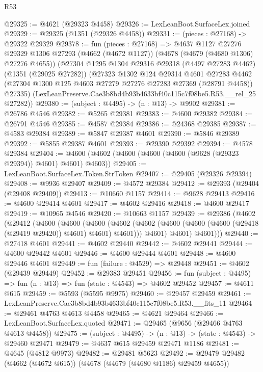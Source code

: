 \begin{lexlean}{R53}
\begin{coremodule}
@29325 := @4621 (@29323 @4458)
@29326 := LexLeanBoot.SurfaceLex.joined
@29329 := @29325 (@1351 (@29326 @4458))
@29331 := (pieces : @27168) -> @29322 @29329
@29378 := fun (pieces : @27168) =>
  @4637
    @1127
    @27276
    @29329
    @1306
    @27293
    (@4662 (@4672 @1127))
    (@4678 (@4679 (@4680 @1306) @27276 @4655))
    (@27304
      @1295
      @1304
      @29316
      @29318
      (@4497 @27283 @4462)
      (@1351 (@29025 @27282))
      (@27323
        @1302
        @124
        @29314
        @4601
        @27283
        @4462
        (@27304 @1300 @125 @4603 @27279 @27276 @27283 @27369 (@28791 @4458))
        @27335)
      (LexLeanPreserve.Cae3b8bd4b93b4633bf40c115c7f08be5.R53.__rel_25 @27282))
@29380 := (subject : @4495) -> (n : @13) -> @9902
@29381 := @26786 @4546
@29382 := @5265 @29381
@29383 := @4600 @29382
@29384 := @26791 @4546
@29385 := @4587 @29384
@29386 := @24368 @29385
@29387 := @4583 @29384
@29389 := @5847 @29387 @4601
@29390 := @5846 @29389
@29392 := @5855 @29387 @4601
@29393 := @29390 @29392
@29394 := @4578 @29384
@29404 := @4600 (@4602 (@4600 (@4600 (@4600 (@9628 (@29323 @29394)) @4601) @4601) @4603))
@29405 := LexLeanBoot.SurfaceLex.Token.StrToken
@29407 := @29405 (@29326 @29394)
@29408 := @9936 @29407
@29409 := @4572 @29384
@29412 := @29393 (@29404 (@29408 @29409))
@29413 := @10660 @1157
@29414 := @9628 @29413
@29416 := @4600 @29414 @4601
@29417 := @4602 @29416
@29418 := @4600 @29417
@29419 := @10965 @4546
@29420 := @10663 @1157
@29439 := @29386
    (@4602
      (@29412
        (@4600
          (@4600
            (@4600
              (@4602 (@4602 (@4600 (@4600 (@4600 (@29418 (@29419 @29420)) @4601) @4601) @4601)))
              @4601)
            @4601)
          @4601)))
@29440 := @27418 @4601
@29441 := @4602 @29440
@29442 := @4602 @29441
@29444 := @4600 @29442 @4601
@29446 := @4600 @29444 @4601
@29448 := @4600 @29446 @4601
@29449 := fun (failure : @4529) => @29448
@29451 := @4602 (@29439 @29449)
@29452 := @29383 @29451
@29456 := fun (subject : @4495) => fun (n : @13) => fun (state : @4543) => @4602 @29452
@29457 := @4611 @615
@29459 := @5593 (@5595 @9975)
@29460 := @29457 @29459
@29461 := LexLeanPreserve.Cae3b8bd4b93b4633bf40c115c7f08be5.R53.__fits_11
@29464 := @29461 @4763 @4613 @4458
@29465 := @4621 @29464
@29466 := LexLeanBoot.SurfaceLex.quoted
@29471 := @29465 (@9656 (@29466 @4763 @4613 @4458))
@29475 := (subject : @4495) -> (n : @13) -> (state : @4543) -> @29460 @29471
@29479 := @4637 @615 @29459 @29471 @1186
@29481 := @4645 (@4812 @9973)
@29482 := @29481 @5623
@29492 := @29479 @29482 (@4662 (@4672 @615)) (@4678 (@4679 (@4680 @1186) @29459 @4655))

\end{coremodule}
\end{lexlean}
